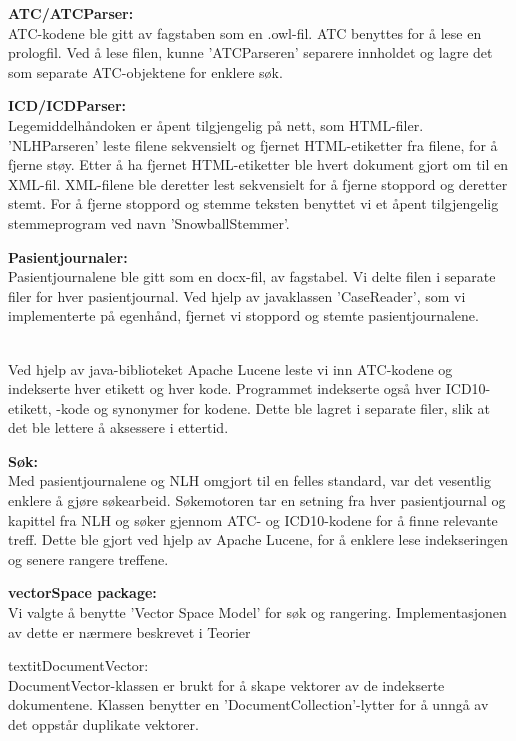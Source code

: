 \begin{description}
\item{\textbf{ATC/ATCParser:}}\\
ATC-kodene ble gitt av fagstaben som en .owl-fil. ATC benyttes for å lese en prologfil. Ved å lese filen, kunne 'ATCParseren' separere innholdet og lagre det som separate ATC-objektene for enklere søk.
\item{\textbf{ICD/ICDParser:}}\\
Legemiddelhåndoken er åpent tilgjengelig på nett, som HTML-filer. 'NLHParseren' leste filene sekvensielt og fjernet HTML-etiketter fra filene, for å fjerne støy. Etter å ha fjernet HTML-etiketter ble hvert dokument gjort om til en XML-fil. XML-filene ble deretter lest sekvensielt for å fjerne stoppord og deretter stemt. For å fjerne stoppord og stemme teksten benyttet vi et åpent tilgjengelig stemmeprogram ved navn 'SnowballStemmer'. 
\item{\textbf{Pasientjournaler:}}\\
Pasientjournalene ble gitt som en docx-fil, av fagstabel. Vi delte filen i separate filer for hver pasientjournal. Ved hjelp av javaklassen 'CaseReader', som vi implementerte på egenhånd, fjernet vi stoppord og stemte pasientjournalene.
\item{}\\
Ved hjelp av java-biblioteket Apache Lucene %
leste vi inn ATC-kodene og indekserte hver etikett og hver kode. Programmet indekserte også hver ICD10-etikett, -kode og synonymer for kodene. Dette ble lagret i separate filer, slik at det ble lettere å aksessere i ettertid.
\item{\textbf{Søk:}}\\
Med pasientjournalene og NLH omgjort til en felles standard, var det vesentlig enklere å gjøre søkearbeid. Søkemotoren tar en setning fra hver pasientjournal og kapittel fra NLH og søker gjennom ATC- og ICD10-kodene for å finne relevante treff. Dette ble gjort ved hjelp av Apache Lucene, for å enklere lese indekseringen og senere rangere treffene.
\item{\textbf{vectorSpace package:}}\\
Vi valgte å benytte 'Vector Space Model' for søk og rangering. Implementasjonen av dette er nærmere beskrevet i Teorier %
\begin{description}
\item{textit{DocumentVector: }} \\
DocumentVector-klassen er brukt for å skape vektorer av de indekserte dokumentene. Klassen benytter en 'DocumentCollection'-lytter for å unngå av det oppstår duplikate vektorer.

\end{description}
\end{description}
